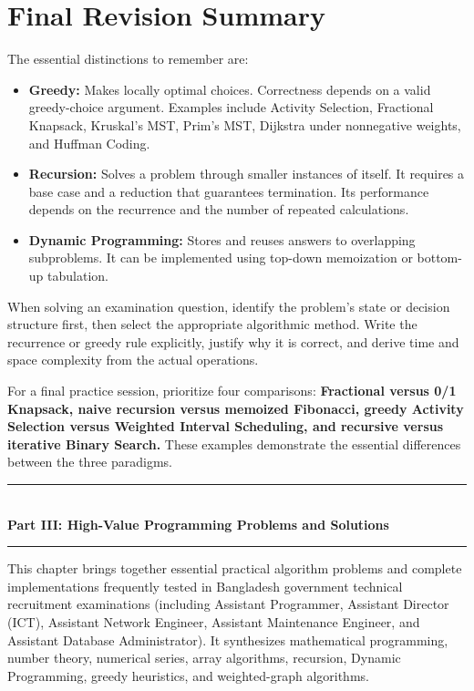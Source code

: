 \section{Final Revision Summary}

The essential distinctions to remember are:

\begin{itemize}
    \item \textbf{Greedy:} Makes locally optimal choices. Correctness depends on a valid greedy-choice argument. Examples include Activity Selection, Fractional Knapsack, Kruskal's MST, Prim's MST, Dijkstra under nonnegative weights, and Huffman Coding.
    \item \textbf{Recursion:} Solves a problem through smaller instances of itself. It requires a base case and a reduction that guarantees termination. Its performance depends on the recurrence and the number of repeated calculations.
    \item \textbf{Dynamic Programming:} Stores and reuses answers to overlapping subproblems. It can be implemented using top-down memoization or bottom-up tabulation.
\end{itemize}

When solving an examination question, identify the problem's state or decision structure first, then select the appropriate algorithmic method. Write the recurrence or greedy rule explicitly, justify why it is correct, and derive time and space complexity from the actual operations.

For a final practice session, prioritize four comparisons: \textbf{Fractional versus 0/1 Knapsack, naive recursion versus memoized Fibonacci, greedy Activity Selection versus Weighted Interval Scheduling, and recursive versus iterative Binary Search.} These examples demonstrate the essential differences between the three paradigms.


\begin{center}
\vspace{1em}
{\color{primary}\rule{0.5\textwidth}{1.5pt}}\\[6pt]
{\Large\bfseries\color{primary} Part III: High-Value Programming Problems and Solutions}\\[3pt]
{\color{primary}\rule{0.5\textwidth}{1.5pt}}
\vspace{1em}
\end{center}

This chapter brings together essential practical algorithm problems and complete implementations frequently tested in Bangladesh government technical recruitment examinations (including Assistant Programmer, Assistant Director (ICT), Assistant Network Engineer, Assistant Maintenance Engineer, and Assistant Database Administrator). It synthesizes mathematical programming, number theory, numerical series, array algorithms, recursion, Dynamic Programming, greedy heuristics, and weighted-graph algorithms.

